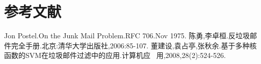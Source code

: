 

\chapter*{参考文献}
\label{cha:bibliography}



\wuhao\noindent [1] \;\; Jon Postel.On the Junk Mail Problem.RFC 706.Nov 1975. 
\newline\wuhao\noindent [2] \;\; 陈勇,李卓桓.反垃圾邮件完全手册.北京:清华大学出版社,2006:85-107.
\newline\wuhao\noindent [18] \;\; 董建设,袁占亭,张秋余.基于多种核函数的SVM在垃圾邮件过滤中的应用.计算机应 
\newline\indent\, 用,2008,28(2):524-526.



